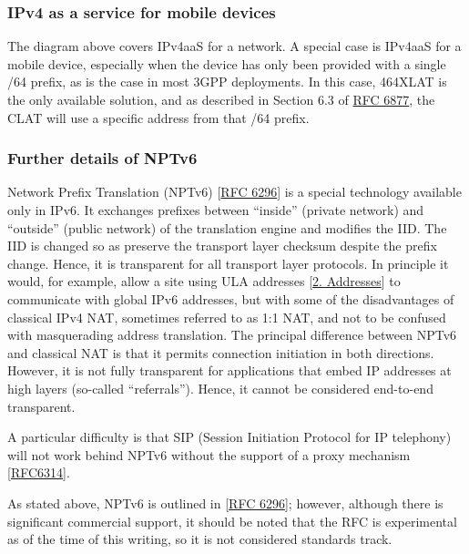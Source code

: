 \documentclass[
]{article}
\begin{document}
\subsubsection{IPv4 as a service for mobile
devices}\label{ipv4-as-a-service-for-mobile-devices}

The diagram above covers IPv4aaS for a network. A special case is
IPv4aaS for a mobile device, especially when the device has only been
provided with a single /64 prefix, as is the case in most 3GPP
deployments. In this case, 464XLAT is the only available solution, and
as described in Section 6.3 of
\href{https://www.rfc-editor.org/info/rfc6877}{RFC 6877}, the CLAT will
use a specific address from that /64 prefix.

\subsubsection{Further details of NPTv6}\label{further-details-of-nptv6}

Network Prefix Translation (NPTv6)
{[}\href{https://www.rfc-editor.org/info/rfc6296}{RFC 6296}{]} is a
special technology available only in IPv6. It exchanges prefixes between
``inside'' (private network) and ``outside'' (public network) of the
translation engine and modifies the IID. The IID is changed so as
preserve the transport layer checksum despite the prefix change. Hence,
it is transparent for all transport layer protocols. In principle it
would, for example, allow a site using ULA addresses
{[}\hyperref[addresses]{2. Addresses}{]} to communicate with global IPv6
addresses, but with some of the disadvantages of classical IPv4 NAT,
sometimes referred to as 1:1 NAT, and not to be confused with
masquerading address translation. The principal difference between NPTv6
and classical NAT is that it permits connection initiation in both
directions. However, it is not fully transparent for applications that
embed IP addresses at high layers (so-called ``referrals''). Hence, it
cannot be considered end-to-end transparent.

A particular difficulty is that SIP (Session Initiation Protocol for IP
telephony) will not work behind NPTv6 without the support of a proxy
mechanism {[}\href{https://www.rfc-editor.org/info/rfc6314}{RFC6314}{]}.

As stated above, NPTv6 is outlined in
{[}\href{https://www.rfc-editor.org/info/rfc6296}{RFC 6296}{]}; however,
although there is significant commercial support, it should be noted
that the RFC is experimental as of the time of this writing, so it is
not considered standards track.
\end{document}

